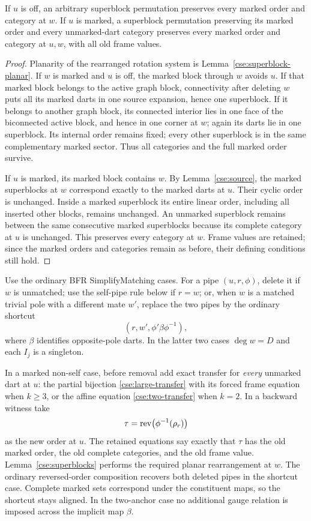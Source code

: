 \begin{lemma}
\label{cse:superblocks}
If $u$ is off, an arbitrary superblock permutation preserves every marked
order and category at $w$. If $u$ is marked, a superblock permutation
preserving its marked order and every unmarked-dart category preserves
every marked order and category at $u,w$, with all old frame values.
\end{lemma}
\begin{proof}
Planarity of the rearranged rotation system is
Lemma~\ref{cse:superblock-planar}.
If $w$ is marked and $u$ is off, the marked block through $w$ avoids $u$.
If that marked block belongs to the active graph block, connectivity
after deleting $w$ puts all its marked darts in one source expansion,
hence one superblock. If it belongs to another graph block, its connected
interior lies in one face of the biconnected active block, and hence in
one corner at $w$; again its darts lie in one superblock. Its internal
order remains fixed; every other superblock is in the same complementary
marked sector. Thus all categories and the full marked order survive.

If $u$ is marked, its marked block contains $w$. By
Lemma~\ref{cse:source}, the marked superblocks at $w$ correspond exactly
to the marked darts at $u$. Their cyclic order is unchanged. Inside a
marked superblock its entire linear order, including all inserted other
blocks, remains unchanged. An unmarked superblock remains between the
same consecutive marked superblocks because its complete category at
$u$ is unchanged. This preserves every category at $w$. Frame values
are retained; since the marked orders and categories remain as before,
their defining conditions still hold.
\end{proof}

Use the ordinary BFR SimplifyMatching cases. For a pipe $(u,r,\phi)$,
delete it if $w$ is unmatched; use the self-pipe rule below if $r=w$;
or, when $w$ is a matched trivial pole with a different mate $w'$, replace
the two pipes by the ordinary shortcut
\[
 (r,w',\phi'\beta\phi^{-1}),
\]
where $\beta$ identifies opposite-pole darts. In the latter two cases
$\deg w=D$ and each $I_j$ is a singleton.

In a marked non-self case, before removal add exact transfer for
\emph{every} unmarked dart at $u$: the partial bijection
\eqref{cse:large-transfer} with its forced frame equation when $k\ge3$,
or the affine equation \eqref{cse:two-transfer} when $k=2$. In a backward
witness take
\[
 \tau=\operatorname{rev}\bigl(\phi^{-1}(\rho_r)\bigr)
\]
as the new order at $u$. The retained equations say exactly that $\tau$
has the old marked order, the old complete categories, and the old frame
value. Lemma~\ref{cse:superblocks} performs the required planar
rearrangement at $w$. The ordinary reversed-order composition recovers
both deleted pipes in the shortcut case. Complete marked sets correspond
under the constituent maps, so the shortcut stays aligned. In the
two-anchor case no additional gauge relation is imposed across the
implicit map $\beta$.

